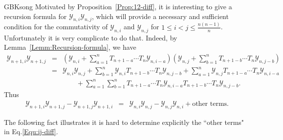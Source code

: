 \documentclass[13pt,a4paper, oneside]{amsart}       %
\numberwithin{equation}{section}
\theoremstyle{definition}
\theoremstyle{remark}
\begin{document}
\begin{CJK*}{GBK}{song}
Motivated by Proposition~\ref{Prop:12-diff}, it is interesting to give a recursion formula for $\mathscr{Y}_{n,i}\mathscr{Y}_{n,j}$, which will provide a necessary and sufficient condition for the commutativity of $\mathscr{Y}_{n,i}$ and $\mathscr{Y}_{n,j}$ for $1\leq i< j\leq \frac{n(n-1)}{n}$. Unfortunately it is very complicate to do that.  Indeed, by Lemma~\ref{Lemm:Recursion-formula}, we have
\begin{eqnarray*}
\mathscr{Y}_{n+1,i}\mathscr{Y}_{n+1,j}&=&
(\mathscr{Y}_{n,i}+\sum_{a=1}^nT_{n+1-a}\cdots T_n\mathscr{Y}_{n,i-a})(\mathscr{Y}_{n,j}+\sum_{b=1}^nT_{n+1-b}\cdots T_n\mathscr{Y}_{n,j-b})\\
&=&\mathscr{Y}_{n,i}\mathscr{Y}_{n,j}+
\sum_{b=1}^n\mathscr{Y}_{n,i}T_{n+1-b}\cdots T_n\mathscr{Y}_{n,j-b}
+\sum_{a=1}^n\mathscr{Y}_{n,j}T_{n+1-a}\cdots T_n\mathscr{Y}_{n,i-a}\\
&&\qquad
+\sum_{a=1}^n\sum_{b=1}^nT_{n+1-a}\cdots T_n\mathscr{Y}_{n,i-a}T_{n+1-b}\cdots T_n\mathscr{Y}_{n,j-b}.
\end{eqnarray*}
Thus \begin{eqnarray}\label{Equ:ij-diff}
\mathscr{Y}_{n+1,i}\mathscr{Y}_{n+1,j}-
\mathscr{Y}_{n+1,j}\mathscr{Y}_{n+1,i}&=&\mathscr{Y}_{n,i}\mathscr{Y}_{n,j}-
\mathscr{Y}_{n,j}\mathscr{Y}_{n,i}+\text{other terms.}
\end{eqnarray}

The following fact illustrates it is hard to determine explicitly the ``other terms" in Eq.\eqref{Equ:ij-diff}.


\end{CJK*}
\end{document}
